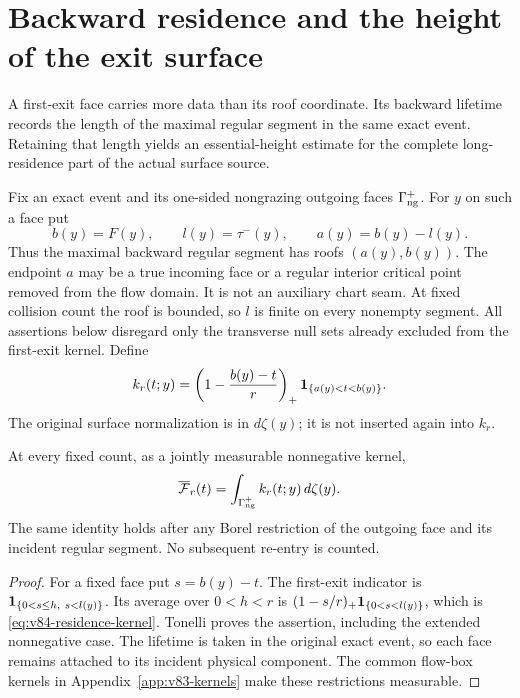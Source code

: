 \section{Backward residence and the height of the exit surface}
\label{sec:v84-residence}
A first-exit face carries more data than its roof coordinate. Its
backward lifetime records the length of the maximal regular segment
in the same exact event. Retaining that length yields an
essential-height estimate for the complete long-residence part of
the actual surface source.

Fix an exact event and its one-sided nongrazing outgoing faces
$\Gamma_{\rm ng}^+$. For $y$ on such a face put
\[
 b(y)=F(y),\qquad l(y)=\tau^-(y),\qquad a(y)=b(y)-l(y).
\]
Thus the maximal backward regular segment has roofs $(a(y),b(y))$.
The endpoint $a$ may be a true incoming face or a regular interior
critical point removed from the flow domain. It is not an auxiliary
chart seam. At fixed collision count the roof is bounded, so $l$ is
finite on every nonempty segment. All assertions below disregard only
the transverse null sets already excluded from the first-exit kernel.
Define
\begin{equation}\label{eq:v84-residence-kernel}
 k_r(t;y)=\left(1-\frac{b(y)-t}{r}\right)_+
                 \one_{\{a(y)<t<b(y)\}}.
\end{equation}
The original surface normalization is in $d\zeta(y)$; it is not
inserted again into $k_r$.

\begin{lemma}
\label{lem:v84-residence-kernel}
At every fixed count, as a jointly measurable nonnegative kernel,
\begin{equation}\label{eq:v84-surface-kernel}
 \overline{\mathcal F}_r(t)=
           \int_{\Gamma_{\rm ng}^+}k_r(t;y)\,d\zeta(y).
\end{equation}
The same identity holds after any Borel restriction of the outgoing
face and its incident regular segment. No subsequent re-entry is
counted.
\end{lemma}
\begin{proof}
For a fixed face put $s=b(y)-t$. The first-exit indicator is
$\mathbf1_{\{0<s\le h,\ s<l(y)\}}$. Its average over $0<h<r$ is
$(1-s/r)_+\mathbf1_{\{0<s<l(y)\}}$, which is
\eqref{eq:v84-residence-kernel}. Tonelli proves the assertion,
including the extended nonnegative case. The lifetime is taken in
the original exact event, so each face remains attached to its
incident physical component. The common flow-box kernels in
Appendix~\ref{app:v83-kernels} make these restrictions measurable.
\end{proof}

